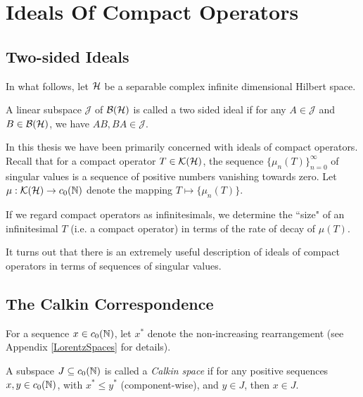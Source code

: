 
\chapter{Ideals Of Compact Operators} %

\label{IdealsOfOperators} %


\section{Two-sided Ideals}
In what follows, let $\mathcal{H}$ be a separable complex infinite dimensional Hilbert space.
\begin{definition}
    A linear subspace $\mathcal{J}$ of $\mathcal{B}(\mathcal{H})$ is called a two
    sided ideal
    if for any $A \in \mathcal{J}$ and $B \in \mathcal{B}(\mathcal{H})$, we
    have $AB,BA \in \mathcal{J}$.
\end{definition}

In this thesis we have been primarily concerned with
ideals of compact operators. Recall
that for a compact operator $T \in \mathcal{K}(\mathcal{H})$,
the sequence $\{\mu_n(T)\}_{n=0}^\infty$ of singular
values is a sequence of positive numbers vanishing towards zero. Let
$\mu:\mathcal{K}(\mathcal{H})\to c_0(\mathbb{N})$ denote the mapping
$T \mapsto \{\mu_n(T)\}$. 

If we regard compact operators as infinitesimals, we determine
the ``size" of an infinitesimal $T$ (i.e. a compact operator)
in terms of the rate of decay of $\mu(T)$. 

 It turns out that there is
an extremely useful description of ideals of compact operators
in terms of sequences of singular values. 
\section{The Calkin Correspondence}
\begin{definition}
    For a sequence $x \in c_0(\mathbb{N})$, let $x^*$
    denote the non-increasing rearrangement (see Appendix \ref{LorentzSpaces}
    for details).

    A subspace $J \subseteq c_0(\mathbb{N})$ is called a 
    \emph{Calkin space} 
    if for any positive sequences $x,y \in c_0(\mathbb{N})$,
    with $x^* \leq y^*$ (component-wise), and $y \in J$,
    then $x \in J$.
\end{definition}

